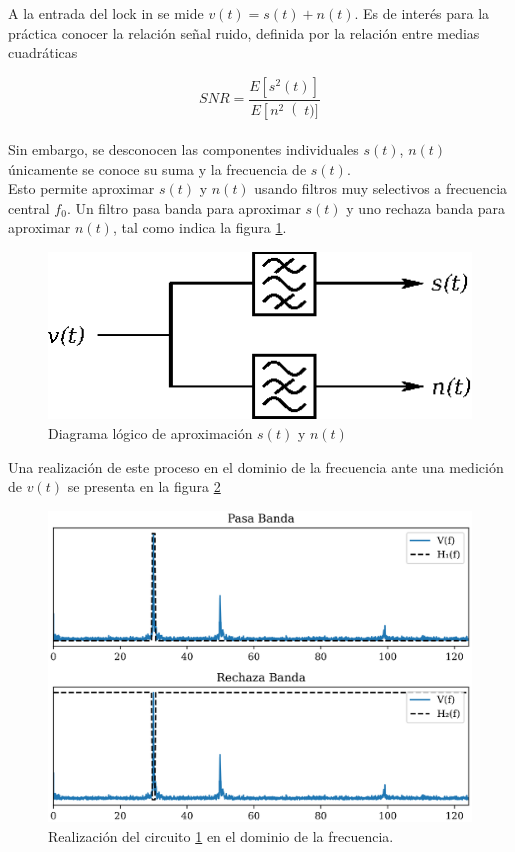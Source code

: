 \documentclass[11pt,a4paper]{extarticle}
\begin{document}
\begin{multicols}{2}
\normalsize
A la entrada del lock in se mide $v(t) = s(t) + n(t)$. Es de interés para la práctica conocer la relación señal ruido, definida por la relación entre medias cuadráticas

\begin{equation}\label{eq:snr}
	SNR = \frac{E\left[s^2(t)\right]}{E\left[n^2\right(t)]}
\end{equation}\\[-1em]

Sin embargo, se desconocen las componentes individuales $s(t)$, $n(t)$ únicamente se conoce su suma y la frecuencia de $s(t)$.\\

Esto permite aproximar $s(t)$ y $n(t)$ usando filtros muy selectivos a frecuencia central $f_0$. Un filtro pasa banda para aproximar $s(t)$ y uno rechaza banda para aproximar $n(t)$, tal como indica la figura \ref{fig:circ_snr}.

\begin{figure}[H]
	\centering
	\includegraphics[width=0.75\linewidth]{Images/circ_snr.eps}
	\caption{Diagrama lógico de aproximación $s(t)$ y $n(t)$}
	\label{fig:circ_snr}
\end{figure}

Una realización de este proceso en el dominio de la frecuencia ante una medición de $v(t)$ se presenta en la figura \ref{fig:snr_filtros}

\begin{figure}[H]
	\centering
	\includegraphics[width=\linewidth]{Images/snr_filtros.eps}
	\caption{Realización del circuito \ref{fig:circ_snr} en el dominio de la frecuencia.}
	\label{fig:snr_filtros}
\end{figure}


\end{multicols}
\end{document}
